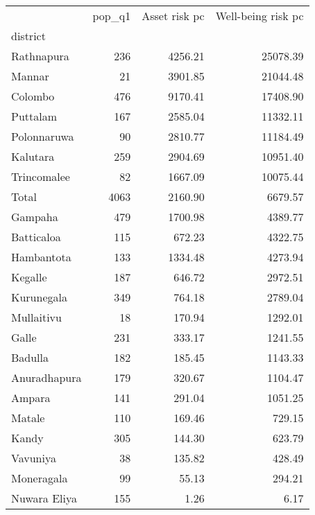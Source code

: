 \begin{tabular}{lrrr}
\toprule
{} &  pop\_q1 &  Asset risk pc &  Well-being risk pc \\
district     &         &                &                     \\
\midrule
Rathnapura   &     236 &        4256.21 &            25078.39 \\
Mannar       &      21 &        3901.85 &            21044.48 \\
Colombo      &     476 &        9170.41 &            17408.90 \\
Puttalam     &     167 &        2585.04 &            11332.11 \\
Polonnaruwa  &      90 &        2810.77 &            11184.49 \\
Kalutara     &     259 &        2904.69 &            10951.40 \\
Trincomalee  &      82 &        1667.09 &            10075.44 \\
Total        &    4063 &        2160.90 &             6679.57 \\
Gampaha      &     479 &        1700.98 &             4389.77 \\
Batticaloa   &     115 &         672.23 &             4322.75 \\
Hambantota   &     133 &        1334.48 &             4273.94 \\
Kegalle      &     187 &         646.72 &             2972.51 \\
Kurunegala   &     349 &         764.18 &             2789.04 \\
Mullaitivu   &      18 &         170.94 &             1292.01 \\
Galle        &     231 &         333.17 &             1241.55 \\
Badulla      &     182 &         185.45 &             1143.33 \\
Anuradhapura &     179 &         320.67 &             1104.47 \\
Ampara       &     141 &         291.04 &             1051.25 \\
Matale       &     110 &         169.46 &              729.15 \\
Kandy        &     305 &         144.30 &              623.79 \\
Vavuniya     &      38 &         135.82 &              428.49 \\
Moneragala   &      99 &          55.13 &              294.21 \\
Nuwara Eliya &     155 &           1.26 &                6.17 \\
\bottomrule
\end{tabular}
